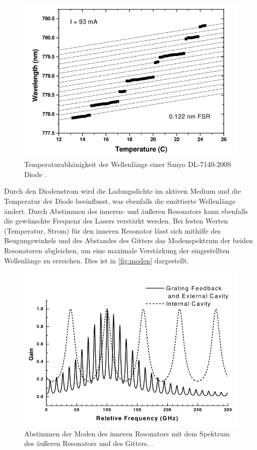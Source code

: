 \begin{figure}
    \centering
    \includegraphics[scale=0.55]{content/pics/temperatur.png}
    \caption{Temperaturabhänigkeit der Wellenlänge einer Sanyo DL-7140-200S Diode \cite{diode_laser_spectroscopy}.}
    \label{fig:temperatur}
\end{figure}
Durch den Diodenstrom wird die Ladungsdichte im aktiven Medium und die Temperatur der Diode beeinflusst, was ebenfalls die emittierte Wellenlänge ändert.
Durch Abstimmen des inneren- und äußeren Resonators kann ebenfalls die gewünschte Frequenz des Lasers verstärkt werden. Bei festen Werten (Temperatur, Strom) für den inneren 
Resonator lässt sich mithilfe des Beugungswinkels und des Abstandes des Gitters das Modenspektrum der beiden Resonatoren abgleichen, um eine maximale Verstärkung der 
eingestellten Wellenlänge zu erreichen. Dies ist in \autoref{fig:moden} dargestellt.

\begin{figure}
    \centering
    \includegraphics[scale=0.55]{content/pics/moden.png}
    \caption{Abstimmen der Moden des inneren Resonators mit dem Spektrum des äußeren Resonators und des Gitters. \cite{diode_laser_spectroscopy}.}
    \label{fig:moden}
\end{figure}

